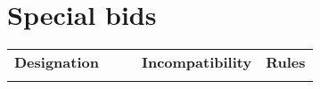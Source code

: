 %
%
%
%

\newcommand{\nonTrump}{\textnormal{non-trump bids}}

\section{Special bids}
	\begin{center}
		\begin{tabularx}{\textwidth}{
				l
				S[table-number-alignment=center, table-format=1.0]
				S[table-number-alignment=center, table-format=1.0]
				p{3cm}
				|X
			}

			\textbf{Designation} &
			 &
			 &
			\textbf{Incompatibility} &
			\textbf{Rules}
			\\[-3ex]

		\end{tabularx}
	\end{center}
